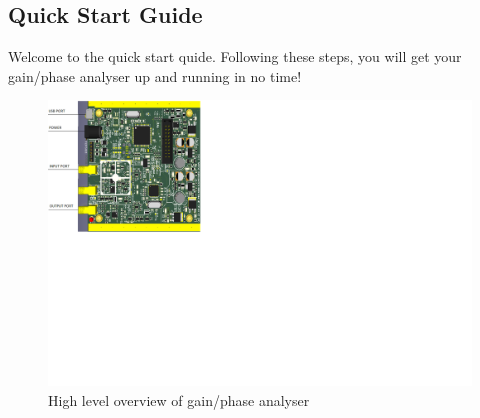 \newpage
\begin{multicols}{2}
\chapter{Quick Start Guide}
	
Welcome to the quick start quide.  Following these steps, you will get your 
gain/phase analyser up and running in no time!

\end{multicols}
\begin{figure}[h]
\centering
\includegraphics[width=6.5in]{getting_started/ports}
\caption{High level overview of gain/phase analyser}
\label{fig:highlevel}
\end{figure}

